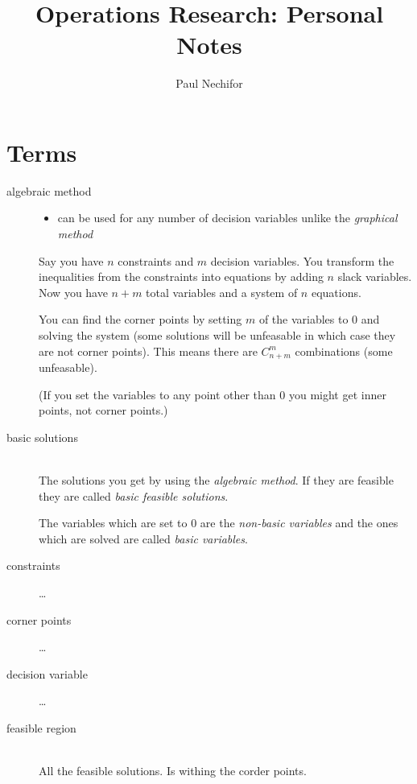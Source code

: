 \documentclass[12pt]{article}
\title{Operations Research: Personal Notes}
\author{Paul Nechifor}
\begin{document}
\maketitle

\section{Terms}

\begin{description}

\item[algebraic method] \hfill
    \begin{itemize}
    \item can be used for any number of decision variables unlike the
        \emph{graphical method}
    \end{itemize}
    
    Say you have $n$ constraints and $m$ decision variables. You transform the
    inequalities from the constraints into equations by adding $n$ slack
    variables. Now you have $n+m$ total variables and a system of $n$ equations.
    
    You can find the corner points by setting $m$ of the variables to 0 and
    solving the system (some solutions will be unfeasable in which case they are
    not corner points). This means there are $C_{n+m}^m$ combinations (some
    unfeasable).
    
    (If you set the variables to any point other than 0 you
    might get inner points, not corner points.)

\item[basic solutions] \hfill \\
    The solutions you get by using the \emph{algebraic method}. If they are
    feasible they are called \emph{basic feasible solutions}.
    
    The variables which are set to 0 are the \emph{non-basic variables} and the
    ones which are solved are called \emph{basic variables}.

\item[constraints] \ldots

\item[corner points] \ldots

\item[decision variable] \ldots

\item[feasible region] \hfill \\
    All the feasible solutions. Is withing the corder points.


\end{description}
\end{document}
